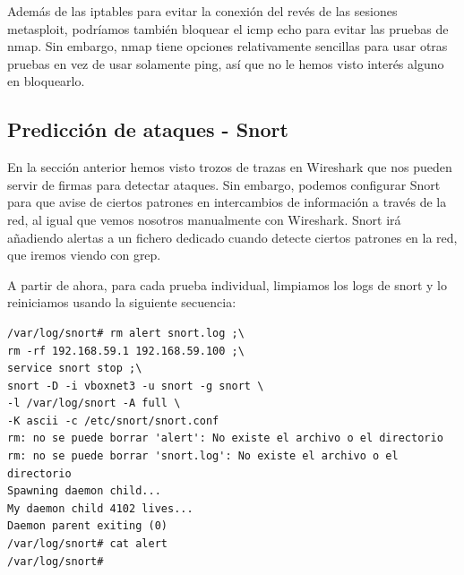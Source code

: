 \documentclass[a4paper,12pt]{scrartcl}
\begin{document}
Además de las iptables para evitar la conexión del revés de las sesiones metasploit, podríamos también bloquear el icmp echo para evitar las pruebas de nmap. Sin embargo, nmap tiene opciones relativamente sencillas para usar otras pruebas en vez de usar solamente ping, así que no le hemos visto interés alguno en bloquearlo.

\subsection{Predicción de ataques - Snort}






En la sección anterior hemos visto trozos de trazas en Wireshark que nos pueden servir de firmas para detectar ataques. Sin embargo, podemos configurar Snort para que avise de ciertos patrones en intercambios de información a través de la red, al igual que vemos nosotros manualmente con Wireshark. Snort irá añadiendo alertas a un fichero dedicado cuando detecte ciertos patrones en la red, que iremos viendo con grep.


A partir de ahora, para cada prueba individual, limpiamos los logs de snort y lo reiniciamos usando la siguiente secuencia:

\begin{verbatim}
/var/log/snort# rm alert snort.log ;\
rm -rf 192.168.59.1 192.168.59.100 ;\ 
service snort stop ;\ 
snort -D -i vboxnet3 -u snort -g snort \
-l /var/log/snort -A full \
-K ascii -c /etc/snort/snort.conf 
rm: no se puede borrar 'alert': No existe el archivo o el directorio
rm: no se puede borrar 'snort.log': No existe el archivo o el directorio
Spawning daemon child...
My daemon child 4102 lives...
Daemon parent exiting (0)
/var/log/snort# cat alert 
/var/log/snort#
\end{verbatim}
\end{document}
